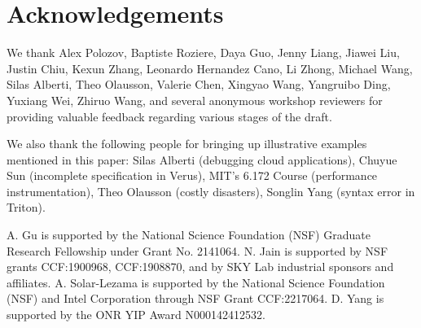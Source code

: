 \section{Acknowledgements}

We thank Alex Polozov, Baptiste Roziere, Daya Guo, Jenny Liang, Jiawei Liu, Justin Chiu, Kexun Zhang, Leonardo Hernandez Cano, Li Zhong, Michael Wang, Silas Alberti, Theo Olausson, Valerie Chen, Xingyao Wang, Yangruibo Ding, Yuxiang Wei, Zhiruo Wang, and several anonymous workshop reviewers for providing valuable feedback regarding various stages of the draft.

We also thank the following people for bringing up illustrative examples mentioned in this paper: Silas Alberti (debugging cloud applications), Chuyue Sun (incomplete specification in Verus), MIT's 6.172 Course (performance instrumentation), Theo Olausson (costly disasters), Songlin Yang (syntax error in Triton).

A. Gu is supported by the National Science Foundation (NSF) Graduate Research Fellowship under Grant No. 2141064. 
N. Jain is supported by NSF grants CCF:1900968, CCF:1908870, and by SKY Lab industrial sponsors and affiliates. 
A. Solar-Lezama is supported by the National Science Foundation (NSF) and Intel Corporation through NSF Grant CCF:2217064.
D. Yang is supported by the ONR YIP Award N000142412532. 